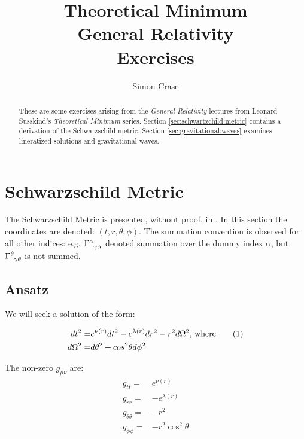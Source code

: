 \documentclass[]{article}
\title{Theoretical Minimum\\General Relativity\\Exercises}
\author{Simon Crase}
\newcommand\numberthis{\addtocounter{equation}{1}\tag{\theequation}}
\begin{document}
\maketitle

\begin{abstract}
	These are some exercises arising from the \emph{General Relativity}\cite{susskind2012general} lectures from Leonard Susskind's \emph{Theoretical Minimum} series\cite{susskind2007theoretical}. Section \ref{sec:schwartzchild:metric} contains a derivation of the Schwarzschild metric. Section \ref{sec:gravitational:waves} examines lineratized solutions and gravitational waves.
\end{abstract}

\tableofcontents
\listoffigures
\listoftables
\listoftheorems

	
\section{Schwarzschild Metric}\label{sec:schwartzchild:metric}

The Schwarzschild Metric is presented, without proof, in \cite[Lecture 6]{susskind2012general}. In this section the coordinates are denoted: $(t,r,\theta,\phi)$. The summation convention is observed for all other indices: e.g. $\Gamma\indices{^\alpha_{\gamma\alpha}}$ denoted summation over the dummy index $\alpha$, but $\Gamma\indices{^\theta_{\gamma\theta}}$ is not summed.

\subsection{Ansatz}
We will seek a solution of the form\cite{Adler1965Introduction}:

\begin{align*}
	dt^2 =& e^{\nu(r)} dt^2 -e^{\lambda(r)} dr^2 -r^2 d \Omega^2 \text{, where} \numberthis \label{eq:schwartzschild:ansatz}\\
	d \Omega^2 =&d\theta^2 + cos^2 \theta d\phi^2 
\end{align*}

The  non-zero $g_{\mu\nu}$ are:
\begin{align*}
	g_{tt}=& e^{\nu(r)}\\
	g_{rr}=&-e^{\lambda(r)}\\
	g_{\theta\theta}=&-r^2\\
	g_{\phi\phi}=&-r^2 \cos^2 \theta\\
\end{align*}
\end{document}
